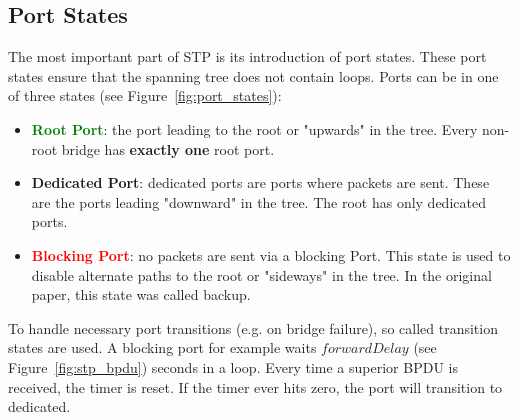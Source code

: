 \subsection*{Port States}
The most important part of STP is its introduction of port states.
These port states ensure that the spanning tree does not contain loops.
Ports can be in one of three states (see Figure~\ref{fig:port_states}):
\begin{itemize}
    \item \textcolor{green}{\textbf{Root Port}}: the port leading to the root or "upwards" in the tree.
        Every non-root bridge has \textbf{exactly one} root port.
    \item \textcolor{blue!80}{\textbf{Dedicated Port}}: dedicated ports are ports where packets are sent. These are the ports leading "downward" in the tree.
        The root has only dedicated ports.
    \item \textcolor{red}{\textbf{Blocking Port}}: no packets are sent via a blocking Port.
        This state is used to disable alternate paths to the root or "sideways" in the tree.
        In the original paper\cite{perlman85}, this state was called backup.
\end{itemize}
To handle necessary port transitions (e.g. on bridge failure), so called transition states are used.
A blocking port for example waits $forwardDelay$ (see Figure~\ref{fig:stp_bpdu}) seconds in a loop.
Every time a superior BPDU is received, the timer is reset.
If the timer ever hits zero, the port will transition to dedicated.

